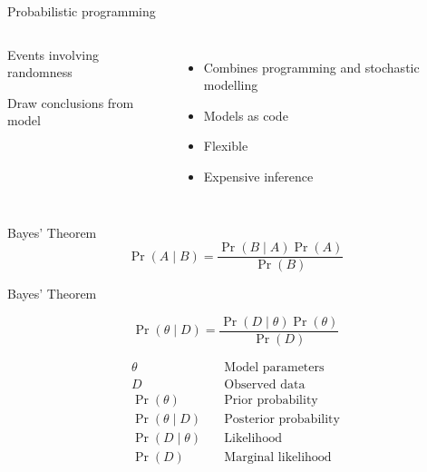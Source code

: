 \documentclass[usenames,dvipsnames,10pt]{beamer}
\begin{document}
\begin{frame}{Probabilistic programming}
    \begin{columns}[T,onlytextwidth]
        \begin{description} \em
            \item[Stochastic] Events involving randomness
            \item[Inference] Draw conclusions from model
        \end{description}

        \begin{itemize}
            \item Combines programming and stochastic modelling

            \item Models as code

            \item Flexible

            \item Expensive inference
        \end{itemize}
    \end{columns}
\end{frame}

\begin{frame}{Bayes' Theorem}\Huge
    \[
        \Pr(A \mid B) = \frac {\Pr(B \mid A) \Pr(A)} {\Pr(B)}
    \] 
\end{frame}

\begin{frame}{Bayes' Theorem}
    \begin{huge}
        
    \[
        \Pr(\theta \mid D) = \frac {\Pr(D \mid \theta) \Pr(\theta)} {\Pr(D)}
    \] 
    \end{huge}

    \begin{align*}
        \theta \quad& \text{Model parameters} \\
        D \quad& \text{Observed data} \\
        \Pr(\theta) \quad& \text{Prior probability} \\
        \Pr(\theta \mid D) \quad& \text{Posterior probability} \\
        \Pr(D \mid \theta) \quad& \text{Likelihood} \\
        \Pr(D) \quad& \text{Marginal likelihood}
    \end{align*}
\end{frame}
\end{document}
